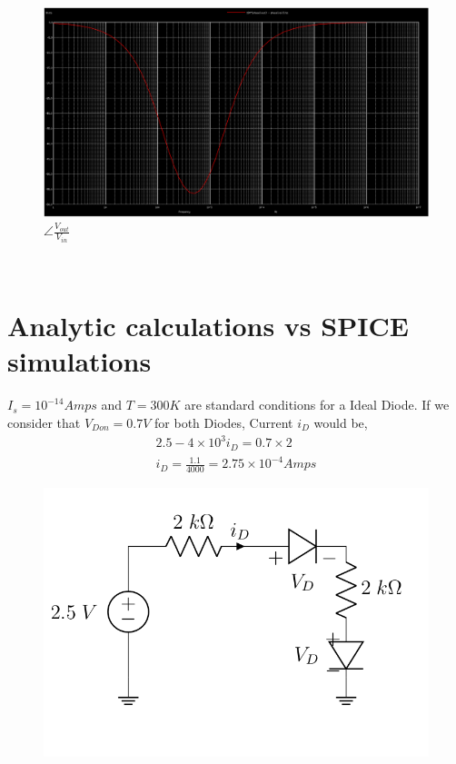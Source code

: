 \documentclass{article}
\begin{document}
\begin{figure}[!ht]
    \centering
    \includegraphics[scale=0.27]{Images/1c_2.png}
    \caption{$\angle \frac{V_{out}}{V_{in}}$}
\end{figure}\\

\section{Analytic calculations vs SPICE simulations}
$I_s = 10^{-14} Amps$ and $T = 300K$ are standard conditions for a Ideal Diode. If we consider that $V_{Don} = 0.7 V$ for both Diodes, Current $i_D$ would be,
\begin{align}
    2.5 - 4\times10^3 i_D = 0.7 \times 2 \\
    i_D = \frac{1.1}{4000} = 2.75 \times 10^{-4} Amps
\end{align}
\begin{figure}[!ht]
    \centering
    \includegraphics[scale=0.27]{Images/2.png}
\end{figure}
\end{document}
